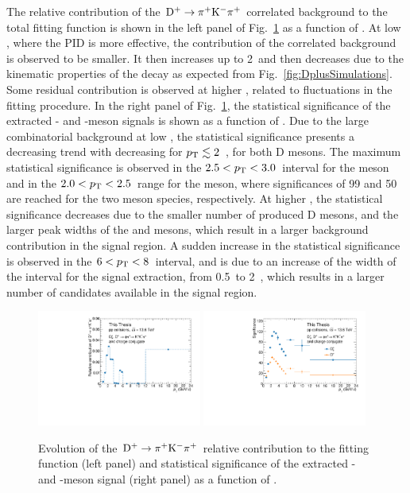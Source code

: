 The relative contribution of the $\mathrm{D^+}\rightarrow\mathrm{\pi^+K^-\pi^+}$ correlated background to the total fitting function is shown in the left panel of Fig.~\ref{fig:frac_signif} as a function of \pt. At low \pt, where the PID is more effective, the contribution of the correlated background is observed to be smaller. It then increases up to 2~\gevc and then decreases due to the kinematic properties of the decay as expected from Fig.~\ref{fig:DplusSimulations}. Some residual contribution is observed at higher \pt, related to fluctuations in the fitting procedure. In the right panel of Fig.~\ref{fig:frac_signif}, the statistical significance of the extracted \ds- and \dpl-meson signals is shown as a function of \pt. Due to the large combinatorial background at low \pt, the statistical significance presents a decreasing trend with decreasing \pt for $p_\mathrm{T}\lesssim2$~\gevc, for both D mesons. The maximum statistical significance is observed in the $2.5<p_\mathrm{T}<3.0$~\gevc interval for the \ds meson and in the $2.0<p_\mathrm{T}<2.5$~\gevc range for the \dpl meson, where significances of 99 and 50 are reached for the two meson species, respectively. At higher \pt, the statistical significance decreases due to the smaller number of produced D mesons, and the larger peak widths of the \ds and \dpl mesons, which result in a larger background contribution in the signal region. A sudden increase in the statistical significance is observed in the $6<p_\mathrm{T}<8$~\gevc interval, and is due to an increase of the width of the \pt interval for the signal extraction, from 0.5~\gevc to 2~\gevc, which results in a larger number of candidates available in the signal region.

\begin{figure}[htb]
    \centering
    \includegraphics[width=0.48\textwidth]{Figures/Chapter 5/Frac.pdf}
    \includegraphics[width=0.48\textwidth]{Figures/Chapter 5/Significance.pdf}
    \caption{Evolution of the $\mathrm{D^+} \rightarrow \mathrm{\pi^+K^-\pi^+}$ relative contribution to the fitting function (left panel) and statistical significance of the extracted \ds- and \dpl-meson signal (right panel) as a function of \pt.}
    \label{fig:frac_signif}
\end{figure}



